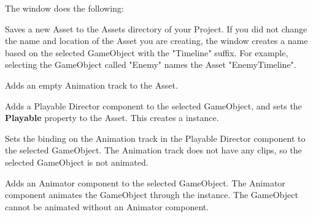 The  window does the following\+:


\begin{DoxyItemize}
\item Saves a new  Asset to the Assets directory of your Project. If you did not change the name and location of the  Asset you are creating, the  window creates a name based on the selected Game\+Object with the "{}\+Timeline"{} suffix. For example, selecting the Game\+Object called "{}\+Enemy"{} names the Asset "{}\+Enemy\+Timeline"{}.
\item Adds an empty Animation track to the  Asset.
\item Adds a Playable Director component to the selected Game\+Object, and sets the {\bfseries{Playable}} property to the  Asset. This creates a  instance.
\item Sets the binding on the Animation track in the Playable Director component to the selected Game\+Object. The Animation track does not have any clips, so the selected Game\+Object is not animated.
\item Adds an Animator component to the selected Game\+Object. The Animator component animates the Game\+Object through the  instance. The Game\+Object cannot be animated without an Animator component. 
\end{DoxyItemize}